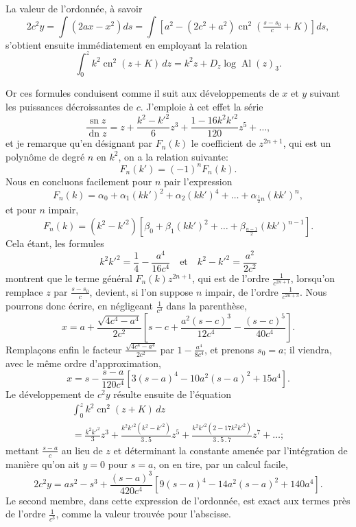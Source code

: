 \documentclass[11pt,leqno,oneside,letterpaper]{book}[2005/09/16]
\DeclareMathOperator{\sn}{sn}
\DeclareMathOperator{\cn}{cn}
\DeclareMathOperator{\dn}{dn}
\DeclareMathOperator{\Al}{Al}
\newcommand{\cntrdot}{\mathbin{.}}
\begin{document}
La valeur de l'ordonn\'ee, \`a savoir
\[
2c^2y = \int \left(2ax - x^2 \right) ds
      = \int \left[a^2 - (2c^2+a^2)\cn^2 \left( \tfrac{s-s_0}{c} + K \right) \right] ds,
\]
s'obtient ensuite imm\'ediatement en employant la relation
\[
\int^z_0 k^2 \cn^2 (z+K)\, dz = k^2 z + D_z \log \Al(z)_3.
\]

Or ces formules conduisent comme il suit aux d\'eveloppements de $x$
et $y$ suivant les puissances d\'ecroissantes de $c$. J'emploie \`a cet effet la s\'erie
\[
\frac{\sn z}{\dn z} = z + \frac{k^2 - k'^2}{6}z^3 + \frac{1 - 16k^2 k'^2}{120}z^5 + \ldots,
\]
et je remarque qu'en d\'esignant par $F_n(k)$ le coefficient de $z^{2n+1}$, qui est un
polyn\^ome de degr\'e $n$ en $k^2$, on a la relation suivante:
\[
F_n(k') = (-1)^n F_n(k).
\]
Nous en concluons facilement pour $n$ pair l'expression
\[
F_n(k) = \alpha_0 + \alpha_1 (kk')^2 + \alpha_2 (kk')^4 + \ldots + \alpha_{\frac{1}{2}n} (kk')^n,
\]
et pour $n$ impair,
\[
F_n(k) = (k^2 - k'^2) \left[ \beta_0 + \beta_1 (kk')^2 + \ldots + \beta_{\frac{n-1}{2}} (kk')^{n-1} \right] .
\]
Cela \'etant, les formules
\[
k^2 k'^2 = \frac{1}{4} - \frac{a^4}{16c^4} \quad \text{et} \quad
     k^2 - k'^2 = \frac{a^2}{2c^2}
\]
montrent que le terme g\'en\'eral $F_n(k)z^{2n+1}$, qui est de l'ordre $\frac{1}{c^{2n+1}}$, lorsqu'on
remplace $z$ par $\frac{s-s_0}{c}$, devient, si l'on suppose $n$ impair, de l'ordre
$\frac{1}{c^{2n+3}}$. Nous pourrons donc \'ecrire, en n\'egligeant $\frac{1}{c^3}$ dans la parenth\`ese,
\[
x = a + \frac{\sqrt{4c^4 - a^4}}{2c^2}
  \left[s-c+\frac{a^2(s-c)^3}{12c^4} %
   - \frac{(s-c)^5}{40c^4} \right].
\]
Rempla\c{c}ons enfin le facteur $\frac{\sqrt{4c^4-a^4}}{2c^2}$ par $1 - \frac{a^4}{8c^4}$, et prenons $s_0 = a$; il
viendra, avec le m\^eme ordre d'approximation,
\[
x = s - \frac{s-a}{120c^4} \left[ 3 (s-a)^4 - 10a^2(s-a)^2 + 15a^4 \right].
\]
Le d\'eveloppement de $c^2 y$ r\'esulte ensuite de l'\'equation
\begin{multline*}
\int_0^z k^2 \cn^2(z+K) \,dz \\
  = \frac{k^2 k'^2}{3}z^3
    + \frac{k^2 k'^2(k^2-k'^2)}{3 \cntrdot 5}z^5
    + \frac{k^2 k'^2 (2 - 17k^2 k'^2)}{3 \cntrdot 5 \cntrdot 7} z^7
    + \ldots;
\end{multline*}
mettant $\frac{s-a}{c}$ au lieu de $z$ et d\'eterminant la constante amen\'ee par l'int\'egra\-tion
de mani\`ere qu'on ait $y = 0$ pour $s = a$, on en tire, par un calcul
facile,
\[
2 c^2 y = as^2 - s^3 + \frac{(s-a)^3}{420c^4}
\left[ 9(s-a)^4 - 14a^2(s-a)^2 + 140a^4 \right].
\]
Le second membre, dans cette expression de l'ordonn\'ee, est exact aux
termes pr\`es de l'ordre $\frac{1}{c^3}$, comme la valeur trouv\'ee pour l'abscisse.
\end{document}
